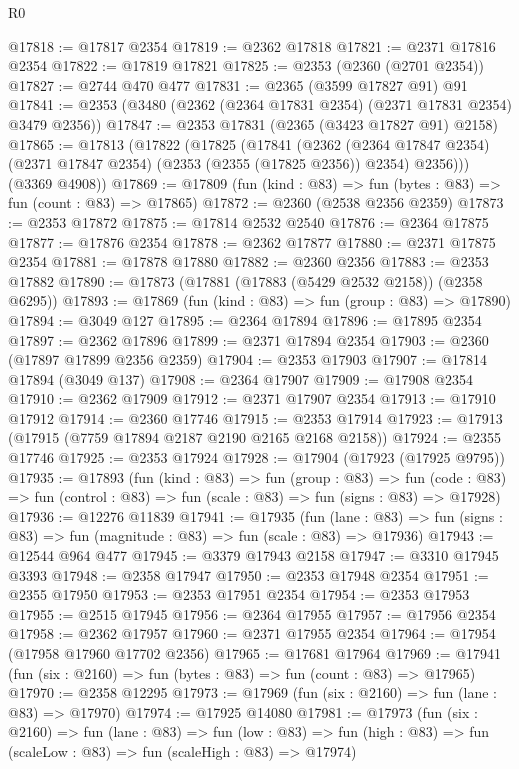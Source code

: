 \begin{lexlean}{R0}
\begin{coremodule}
@17818 := @17817 @2354
@17819 := @2362 @17818
@17821 := @2371 @17816 @2354
@17822 := @17819 @17821
@17825 := @2353 (@2360 (@2701 @2354))
@17827 := @2744 @470 @477
@17831 := @2365 (@3599 @17827 @91) @91
@17841 := @2353 (@3480 (@2362 (@2364 @17831 @2354) (@2371 @17831 @2354) @3479 @2356))
@17847 := @2353 @17831 (@2365 (@3423 @17827 @91) @2158)
@17865 := @17813
    (@17822
      (@17825
        (@17841
          (@2362
            (@2364 @17847 @2354)
            (@2371 @17847 @2354)
            (@2353 (@2355 (@17825 @2356)) @2354)
            @2356)))
      (@3369 @4908))
@17869 := @17809 (fun (kind : @83) => fun (bytes : @83) => fun (count : @83) => @17865)
@17872 := @2360 (@2538 @2356 @2359)
@17873 := @2353 @17872
@17875 := @17814 @2532 @2540
@17876 := @2364 @17875
@17877 := @17876 @2354
@17878 := @2362 @17877
@17880 := @2371 @17875 @2354
@17881 := @17878 @17880
@17882 := @2360 @2356
@17883 := @2353 @17882
@17890 := @17873 (@17881 (@17883 (@5429 @2532 @2158)) (@2358 @6295))
@17893 := @17869 (fun (kind : @83) => fun (group : @83) => @17890)
@17894 := @3049 @127
@17895 := @2364 @17894
@17896 := @17895 @2354
@17897 := @2362 @17896
@17899 := @2371 @17894 @2354
@17903 := @2360 (@17897 @17899 @2356 @2359)
@17904 := @2353 @17903
@17907 := @17814 @17894 (@3049 @137)
@17908 := @2364 @17907
@17909 := @17908 @2354
@17910 := @2362 @17909
@17912 := @2371 @17907 @2354
@17913 := @17910 @17912
@17914 := @2360 @17746
@17915 := @2353 @17914
@17923 := @17913 (@17915 (@7759 @17894 @2187 @2190 @2165 @2168 @2158))
@17924 := @2355 @17746
@17925 := @2353 @17924
@17928 := @17904 (@17923 (@17925 @9795))
@17935 := @17893
    (fun (kind : @83) =>
    fun (group : @83) =>
    fun (code : @83) => fun (control : @83) => fun (scale : @83) => fun (signs : @83) => @17928)
@17936 := @12276 @11839
@17941 := @17935
    (fun (lane : @83) => fun (signs : @83) => fun (magnitude : @83) => fun (scale : @83) => @17936)
@17943 := @12544 @964 @477
@17945 := @3379 @17943 @2158
@17947 := @3310 @17945 @3393
@17948 := @2358 @17947
@17950 := @2353 @17948 @2354
@17951 := @2355 @17950
@17953 := @2353 @17951 @2354
@17954 := @2353 @17953
@17955 := @2515 @17945
@17956 := @2364 @17955
@17957 := @17956 @2354
@17958 := @2362 @17957
@17960 := @2371 @17955 @2354
@17964 := @17954 (@17958 @17960 @17702 @2356)
@17965 := @17681 @17964
@17969 := @17941 (fun (six : @2160) => fun (bytes : @83) => fun (count : @83) => @17965)
@17970 := @2358 @12295
@17973 := @17969 (fun (six : @2160) => fun (lane : @83) => @17970)
@17974 := @17925 @14080
@17981 := @17973
    (fun (six : @2160) =>
    fun (lane : @83) =>
    fun (low : @83) => fun (high : @83) => fun (scaleLow : @83) => fun (scaleHigh : @83) => @17974)

\end{coremodule}
\end{lexlean}
